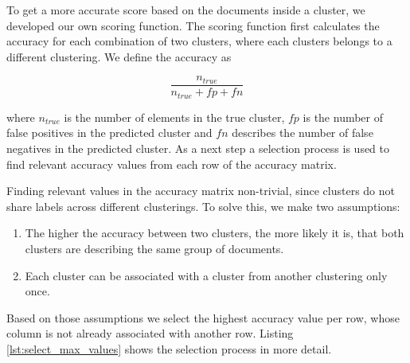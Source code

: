 To get a more accurate score based on the documents inside a cluster, we developed our own scoring function. The scoring function first calculates the accuracy for each combination of two clusters, where each clusters belongs to a different clustering. We define the accuracy as

\begin{equation}
    \label{equ:accuracy}
        \frac{n_{true}}{n_{true} + fp + fn}
    \end{equation}

where $n_{true}$ is the number of elements in the true cluster, $fp$ is the number of false positives in the predicted cluster and $fn$ describes the number of false negatives in the predicted cluster. As a next step a selection process is used to find relevant accuracy values from each row of the accuracy matrix. 

Finding relevant values in the accuracy matrix non-trivial, since clusters do not share labels across different clusterings. To solve this, we make two assumptions:
\begin{enumerate} 
\item The higher the accuracy between two clusters, the more likely it is, that both clusters are describing the same group of documents. 
\item Each cluster can be associated with a cluster from another clustering only once.
\end{enumerate}

Based on those assumptions we select the highest accuracy value per row, whose column is not already associated with another row. Listing \ref{lst:select_max_values} shows the selection process in more detail. 

